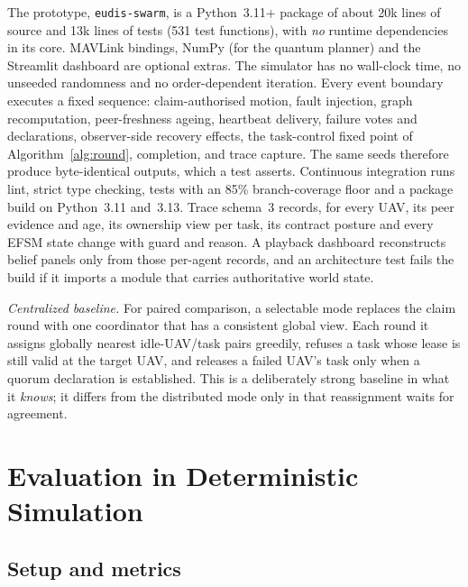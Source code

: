 \documentclass[conference]{IEEEtran}
\newcommand{\code}[1]{\texttt{#1}}    %
\begin{document}
The prototype, \code{eudis-swarm}, is a Python~3.11+ package of about 20k
lines of source and 13k lines of tests (531 test functions), with \emph{no}
runtime dependencies in its core. MAVLink bindings, NumPy (for the quantum
planner) and the Streamlit dashboard are optional extras. The simulator has
no wall-clock time, no unseeded randomness and no order-dependent iteration.
Every event boundary executes a fixed sequence: claim-authorised motion,
fault injection, graph recomputation, peer-freshness ageing, heartbeat
delivery, failure votes and declarations, observer-side recovery effects,
the task-control fixed point of Algorithm~\ref{alg:round}, completion, and
trace capture. The same seeds therefore produce byte-identical outputs, which
a test asserts. Continuous integration runs lint, strict type checking,
tests with an 85\% branch-coverage floor and a package build on Python~3.11
and~3.13. Trace schema~3 records, for every UAV, its peer evidence and age,
its ownership view per task, its contract posture and every EFSM state change
with guard and reason. A playback dashboard reconstructs belief panels only
from those per-agent records, and an architecture test fails the build if it
imports a module that carries authoritative world state.

\emph{Centralized baseline.} For paired comparison, a selectable mode
replaces the claim round with one coordinator that has a consistent global
view. Each round it assigns globally nearest idle-UAV/task pairs greedily,
refuses a task whose lease is still valid at the target UAV, and releases a
failed UAV's task only when a quorum declaration is established. This is a
deliberately strong baseline in what it \emph{knows}; it differs from the
distributed mode only in that reassignment waits for agreement.

\section{Evaluation in Deterministic Simulation}
\label{sec:eval}

\subsection{Setup and metrics}
\end{document}

